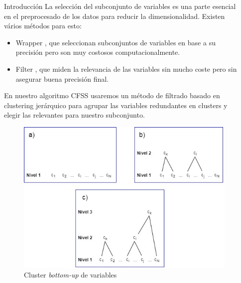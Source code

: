 \documentclass[final]{beamer}
\newlength{\sepwid}
\newlength{\onecolwid}
\begin{document}
\begin{frame}[t]
\begin{columns}[t]
\begin{column}{\onecolwid}
\begin{block}{Introducción}
La selección del subconjunto de variables es una parte esencial en el preprocesado de los datos para reducir la dimensionalidad. Existen vários métodos para esto:

\begin{itemize}
\item Wrapper \cite{kohavi1997}, que seleccionan subconjuntos de variables en base a su precisión pero son muy costosos computacionalmente.
\item Filter \cite{peng2005}, que miden la relevancia de las variables sin mucho coste pero sin asegurar buena precisión final.
\end{itemize}

En nuestro algoritmo CFSS usaremos un método de filtrado basado en clustering jerárquico para agrupar las variables redundantes en clusters y elegir las relevantes para nuestro subconjunto.

\end{block}


\begin{figure}
\includegraphics[width=1\linewidth]{clusterSteps.jpg}
\caption{Cluster \textit{bottom-up} de variables}
\label{fig:CL}
\end{figure}


\end{column} %

\begin{column}{\sepwid}\end{column} %


\end{columns}
\end{frame}
\end{document}
